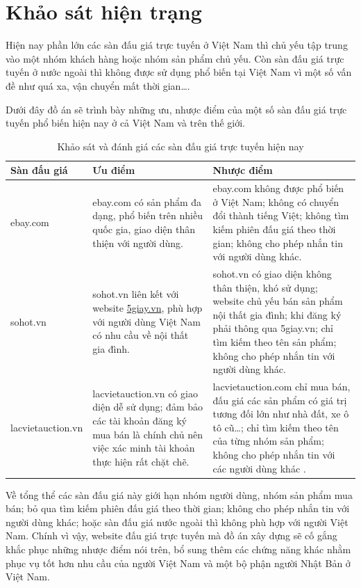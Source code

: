 \documentclass[../DoAn.tex]{subfiles}
\begin{document}
\section{Khảo sát hiện trạng}
\label{section:2.1}
Hiện nay phần lớn các sàn đấu giá trực tuyến ở Việt Nam thì chủ yếu tập trung vào một nhóm khách hàng hoặc nhóm sản phẩm chủ yếu. Còn sàn đấu giá trực tuyến ở nước ngoài thì không được sử dụng phổ biến tại Việt Nam vì một số vấn đề như quá xa, vận chuyển mất thời gian….

Dưới đây đồ án sẽ trình bày những ưu, nhược điểm của một số sàn đấu giá trực tuyến phổ biến hiện nay ở cả Việt Nam và trên thế giới.

    \begin{longtable}{| p{} | p{} | p{} |} 
        \caption{Khảo sát và đánh giá các sàn đấu giá trực tuyến hiện nay}
        \label{bang21}
        \endfirsthead
        \endhead
        \hline
        \bfseries Sàn đấu giá & \bfseries Ưu điểm &  \bfseries Nhược điểm\\\hline
        ebay.com\cite{ebay} &  ebay.com có sản phẩm đa dạng, phổ biến trên nhiều quốc gia, giao diện thân thiện với người dùng.
        &  ebay.com không được phổ biến ở Việt Nam; không có chuyển đổi thành tiếng Việt; không tìm kiếm phiên đấu giá theo thời gian; không cho phép nhắn tin với người dùng khác.\\\hline
        sohot.vn\cite{sohot} &  sohot.vn liên kết với website \href{https://www.5giay.vn/}{5giay.vn}, phù hợp với người dùng Việt Nam có nhu cầu về nội thất gia đình.&  sohot.vn có giao diện không thân thiện, khó sử dụng; website chủ yếu bán sản phẩm nội thất gia đình; khi đăng ký phải thông qua 5giay.vn; chỉ tìm kiếm theo tên sản phẩm; không cho phép nhắn tin với người dùng khác.\\\hline
        lacvietauction.vn\cite{lacvietauction} & lacvietauction.vn có giao diện dễ sử dụng; đảm bảo các tài khoản đăng ký mua bán là chính chủ nên việc xác minh tài khoản thực hiện rất chặt chẽ. & lacvietauction.com chỉ mua bán, đấu giá các sản phẩm có giá trị tương đối lớn như nhà đất, xe ô tô cũ…; chỉ tìm kiếm theo tên của từng nhóm sản phẩm; không cho phép nhắn tin với các người dùng khác .\\\hline
    \end{longtable}

Về tổng thể các sàn đấu giá này giới hạn nhóm người dùng, nhóm sản phẩm mua bán; bỏ qua tìm kiếm phiên đấu giá theo thời gian; không cho phép nhắn tin với người dùng khác; hoặc sàn đấu giá nước ngoài thì không phù hợp với người Việt Nam. Chính vì vậy, website đấu giá trực tuyến mà đồ án xây dựng sẽ cố gắng khắc phục những nhược điểm nói trên, bổ sung thêm các chứng năng khác nhằm phục vụ tốt hơn nhu cầu của người Việt Nam và một bộ phận người Nhật Bản ở Việt Nam.
\end{document}
